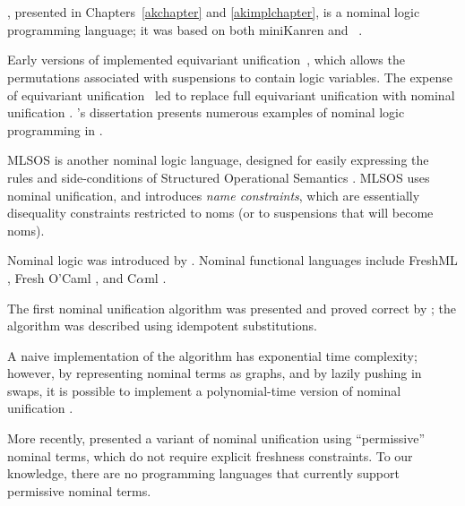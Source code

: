 \section{\alphakanren}\label{alphakanrenrelated}

\alphakanren, presented in Chapters~\ref{akchapter} and
\ref{akimplchapter}, is a nominal logic programming language; it was
based on both miniKanren and
\alphaprolog~\cite{CheneyThesis,CheneyU04}.

Early versions of \alphaprologsp implemented equivariant
unification~\cite{DBLP:conf/rta/Cheney05}, which allows the
permutations associated with suspensions to contain logic variables.
The expense of equivariant unification~\cite{DBLP:conf/icalp/Cheney04}
led \citeauthor{DBLP:conf/tlca/UrbanC05} to replace full equivariant
unification with nominal unification \cite{DBLP:conf/tlca/UrbanC05}.
\citeauthor{CheneyThesis}'s dissertation presents numerous examples of
nominal logic programming in \alphaprologsp \cite{CheneyThesis}.

MLSOS \cite{lakin2007} is another nominal logic language, designed for
easily expressing the rules and side-conditions of Structured
Operational Semantics \cite{Plotkin:2004:SAO}.  MLSOS uses nominal
unification, and introduces \emph{name constraints}, which are
essentially disequality constraints restricted to noms (or to
suspensions that will become noms).

Nominal logic was introduced by \citeauthor{Pitts03}
\citeyearpar{Pitts03}.  Nominal functional languages include FreshML
\cite{ShinwellPG03}, Fresh O'Caml \cite{journals/entcs/Shinwell06},
and C$\alpha$ml \cite{pottier06}.

The first nominal unification algorithm was presented and proved
correct by \citeauthor{Urban-Pitts-Gabbay/04}
\citeyearpar{Urban-Pitts-Gabbay/04}; the algorithm was described using
idempotent substitutions.  

A naive implementation of the \citeauthor{Urban-Pitts-Gabbay/04}
algorithm has exponential time complexity; however, by representing
nominal terms as graphs, and by lazily pushing in swaps, it is
possible to implement a polynomial-time version of nominal unification
\cite{DBLP:journals/tcs/CalvesF08,implnomunif}.

More recently, \citet{DowekEtAl} presented a variant
of nominal unification using ``permissive'' nominal terms, which do
not require explicit freshness constraints.  To our knowledge, there
are no programming languages that currently support permissive nominal
terms.

